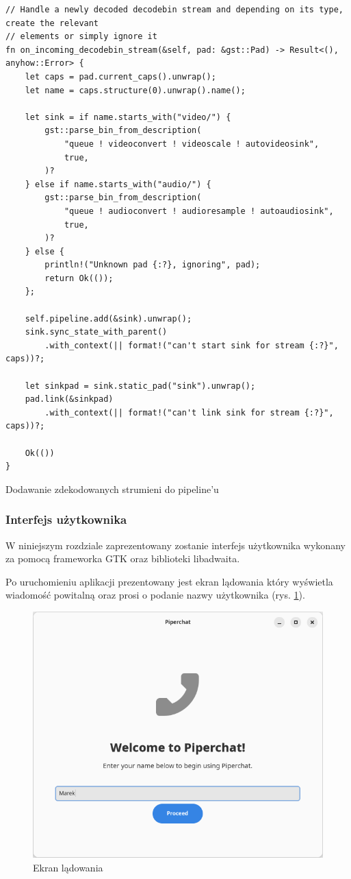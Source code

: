 \begin{listing}[H]
    \begin{verbatim}
// Handle a newly decoded decodebin stream and depending on its type, create the relevant
// elements or simply ignore it
fn on_incoming_decodebin_stream(&self, pad: &gst::Pad) -> Result<(), anyhow::Error> {
    let caps = pad.current_caps().unwrap();
    let name = caps.structure(0).unwrap().name();

    let sink = if name.starts_with("video/") {
        gst::parse_bin_from_description(
            "queue ! videoconvert ! videoscale ! autovideosink",
            true,
        )?
    } else if name.starts_with("audio/") {
        gst::parse_bin_from_description(
            "queue ! audioconvert ! audioresample ! autoaudiosink",
            true,
        )?
    } else {
        println!("Unknown pad {:?}, ignoring", pad);
        return Ok(());
    };

    self.pipeline.add(&sink).unwrap();
    sink.sync_state_with_parent()
        .with_context(|| format!("can't start sink for stream {:?}", caps))?;

    let sinkpad = sink.static_pad("sink").unwrap();
    pad.link(&sinkpad)
        .with_context(|| format!("can't link sink for stream {:?}", caps))?;

    Ok(())
}
\end{verbatim}
    \caption{Dodawanie zdekodowanych strumieni do pipeline'u}
    \label{lst:pipeline-3}
\end{listing}


\subsubsection{Interfejs użytkownika}

W niniejszym rozdziale zaprezentowany zostanie interfejs użytkownika wykonany za pomocą frameworka
GTK oraz biblioteki libadwaita.

Po uruchomieniu aplikacji prezentowany jest ekran lądowania który wyświetla wiadomość powitalną oraz
prosi o podanie nazwy użytkownika (rys. \ref{fig:screen_landing}).

\begin{figure}[H]
    \centering
    \includegraphics[width=.5\textwidth]{img/gui/screen_landing}
    \caption{Ekran lądowania}
    \label{fig:screen_landing}
\end{figure}

